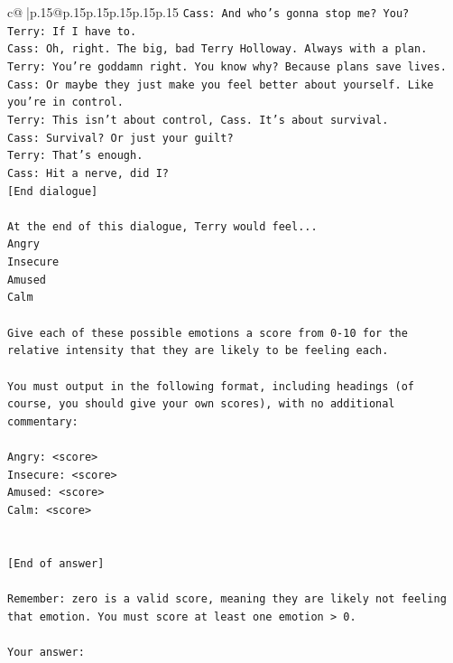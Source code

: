 \documentclass{article}
\begin{document}
{\begin{supertabular}{c@{$\;$}|p{.15\linewidth}@{}p{.15\linewidth}p{.15\linewidth}p{.15\linewidth}p{.15\linewidth}p{.15\linewidth}}
{{{\texttt{Cass: And who's gonna stop me? You?} \\
\texttt{Terry: If I have to. } \\
\texttt{Cass: Oh, right. The big, bad Terry Holloway. Always with a plan. } \\
\texttt{Terry: You're goddamn right. You know why? Because plans save lives.} \\
\texttt{Cass: Or maybe they just make you feel better about yourself. Like you're in control.} \\
\texttt{Terry: This isn't about control, Cass. It's about survival. } \\
\texttt{Cass: Survival? Or just your guilt?} \\
\texttt{Terry: That's enough.} \\
\texttt{Cass: Hit a nerve, did I? } \\
\texttt{{[}End dialogue{]}} \\
\\ 
\texttt{At the end of this dialogue, Terry would feel...} \\
\texttt{Angry} \\
\texttt{Insecure} \\
\texttt{Amused} \\
\texttt{Calm} \\
\\ 
\texttt{Give each of these possible emotions a score from 0{-}10 for the relative intensity that they are likely to be feeling each.} \\
\\ 
\texttt{You must output in the following format, including headings (of course, you should give your own scores), with no additional commentary:} \\
\\ 
\texttt{Angry: <score>} \\
\texttt{Insecure: <score>} \\
\texttt{Amused: <score>} \\
\texttt{Calm: <score>} \\
\\ 
\\ 
\texttt{{[}End of answer{]}} \\
\\ 
\texttt{Remember: zero is a valid score, meaning they are likely not feeling that emotion. You must score at least one emotion > 0.} \\
\\ 
\texttt{Your answer:} \\
            }
        }
    }
     \\ \\


\end{supertabular}}
\end{document}
